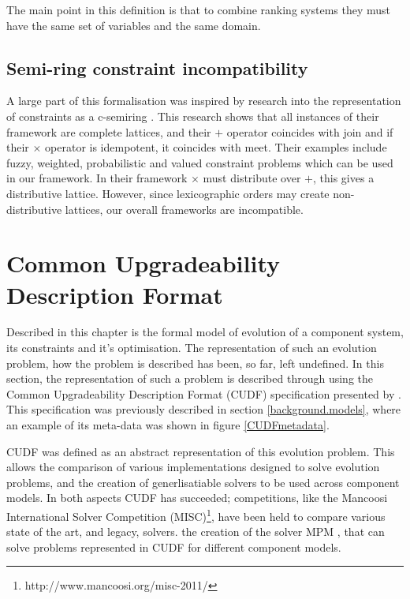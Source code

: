 The main point in this definition is that to combine ranking systems they must have the same set of variables 
and the same domain.

\subsection{Semi-ring constraint incompatibility}
A large part of this formalisation was inspired by research into the representation of constraints as a c-semiring \cite{Bistarelli1997}.
This research shows that all instances of their framework are complete lattices, and their $+$ operator coincides with join
and if their $\times$ operator is idempotent, it coincides with meet.
Their examples include fuzzy, weighted, probabilistic and valued constraint problems which can be used in our framework.
In their framework $\times$ must distribute over $+$, this gives a distributive lattice.
However, since lexicographic orders may create non-distributive lattices, our overall frameworks are incompatible.


\section{Common Upgradeability Description Format}
\label{formal.cudf}
Described in this chapter is the formal model of evolution of a component system, its constraints and it's optimisation.
The representation of such an evolution problem, how the problem is described has been, so far, left undefined.
In this section, the representation of such a problem is described through using the Common Upgradeability Description Format (CUDF) specification presented by \cite{treinen2009common}.
This specification was previously described in section \ref{background.models}, where an example of its meta-data was shown in figure \ref{CUDFmetadata}.

CUDF was defined as an abstract representation of this evolution problem.
This allows the comparison of various implementations designed to solve evolution problems, and the creation of generlisatiable solvers to be used across component models.
In both aspects CUDF has succeeded;
competitions, like the Mancoosi International Solver Competition (MISC)\footnote{http://www.mancoosi.org/misc-2011/}, have been held to compare various state of the art, and legacy, solvers.
the creation of the solver MPM \cite{abate2011}, that can solve problems represented in CUDF for different component models.

